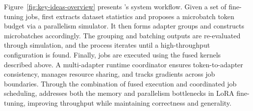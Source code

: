 Figure~\ref{fig:key-ideas-overview} presents \Name's system workflow. Given a set of fine-tuning jobs, \Name first extracts dataset statistics and proposes a microbatch token budget via a parallelism simulator. It then forms adapter groups and constructs microbatches accordingly. The grouping and batching outputs are re-evaluated through simulation, and the process iterates until a high-throughput configuration is found. Finally, jobs are executed using the fused kernels described above. A multi-adapter runtime coordinator ensures token-to-adapter consistency, manages resource sharing, and tracks gradients across job boundaries.
Through the combination of fused execution and coordinated job scheduling, \Name addresses both the memory and parallelism bottlenecks in LoRA fine-tuning, improving throughput while maintaining correctness and generality.

